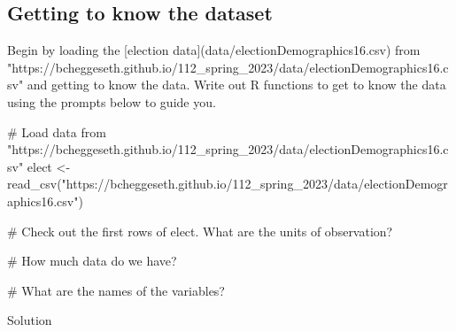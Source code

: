 \documentclass[
  letterpaper,
  DIV=11,
  numbers=noendperiod]{scrreprt}
\newenvironment{Shaded}{\begin{snugshade}}{\end{snugshade}}
\newcommand{\CommentTok}[1]{\textcolor[rgb]{0.37,0.37,0.37}{#1}}
\newcommand{\FunctionTok}[1]{\textcolor[rgb]{0.28,0.35,0.67}{#1}}
\newcommand{\NormalTok}[1]{\textcolor[rgb]{0.00,0.23,0.31}{#1}}
\newcommand{\OtherTok}[1]{\textcolor[rgb]{0.00,0.23,0.31}{#1}}
\newcommand{\StringTok}[1]{\textcolor[rgb]{0.13,0.47,0.30}{#1}}
\begin{document}
\subsection*{Getting to know the
dataset}\label{getting-to-know-the-dataset}

\begin{Shaded}
\begin{Highlighting}[]
\NormalTok{Begin by loading the [election data](data/electionDemographics16.csv) from "https://bcheggeseth.github.io/112\_spring\_2023/data/electionDemographics16.csv" and getting to know the data. Write out R functions to get to know the data using the prompts below to guide you.}
\end{Highlighting}
\end{Shaded}

\begin{Shaded}
\begin{Highlighting}[]
\CommentTok{\# Load data from "https://bcheggeseth.github.io/112\_spring\_2023/data/electionDemographics16.csv"}
\NormalTok{elect }\OtherTok{\textless{}{-}} \FunctionTok{read\_csv}\NormalTok{(}\StringTok{"https://bcheggeseth.github.io/112\_spring\_2023/data/electionDemographics16.csv"}\NormalTok{)}

\CommentTok{\# Check out the first rows of elect.  What are the units of observation?}


\CommentTok{\# How much data do we have?}


\CommentTok{\# What are the names of the variables?}
\end{Highlighting}
\end{Shaded}

Solution
\end{document}

